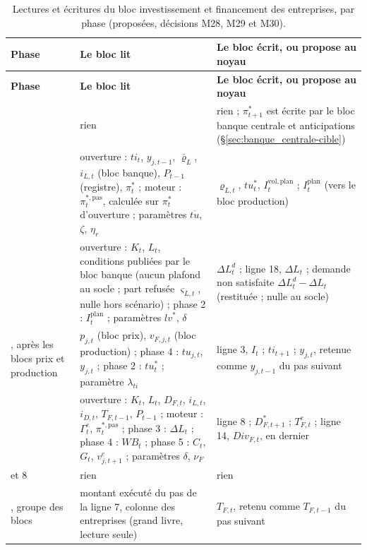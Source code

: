 \documentclass[11pt,a4paper]{article}
\begin{document}
\begin{center}\small
\begin{longtable}{>{\raggedright\arraybackslash}p{1.8cm}>{\raggedright\arraybackslash}p{7.3cm}>{\raggedright\arraybackslash}p{5.8cm}}
\caption{Lectures et écritures du bloc investissement et financement des entreprises, par phase (proposées, décisions M28, M29 et M30).}\label{tab:investissement-phases}\\
\toprule
\textbf{Phase} & \textbf{Le bloc lit} & \textbf{Le bloc écrit, ou propose au noyau}\\
\midrule
\endfirsthead
\toprule
\textbf{Phase} & \textbf{Le bloc lit} & \textbf{Le bloc écrit, ou propose au noyau}\\
\midrule
\endhead
1 & rien & rien ; $\pi^\ast_{t+1}$ est écrite par le bloc banque centrale et anticipations (\S\ref{sec:banque_centrale-cible})\\
2 & ouverture : $\mathit{ti}_t$, $y_{j,t-1}$, $\bar\varrho_L$, $i_{L,t}$ (bloc banque), $P_{t-1}$ (registre), $\pi^\ast_t$ ; moteur : $\pi^{\ast,\mathrm{pas}}_t$, calculée sur $\pi^\ast_t$ d'ouverture ; paramètres $\overline{\mathit{tu}}$, $\zeta$, $\eta_r$ & $\varrho_{L,t}$, $\mathit{tu}^\ast_t$, $I^{\mathrm{vol},\mathrm{plan}}_t$ ; $I^{\mathrm{plan}}_t$ (vers le bloc production)\\
3 & ouverture : $K_t$, $L_t$, conditions publiées par le bloc banque (aucun plafond au socle ; part refusée $\varsigma_{L,t}$, nulle hors scénario) ; phase 2 : $I^{\mathrm{plan}}_t$ ; paramètres $\mathit{lv}^\ast$, $\delta$ & $\Delta L^d_t$ ; ligne 18, $\Delta L_t$ ; demande non satisfaite $\Delta L^d_t - \Delta L_t$ (restituée ; nulle au socle)\\
5, après les blocs prix et production & $p_{j,t}$ (bloc prix), $v_{F,j,t}$ (bloc production) ; phase 4 : $\mathit{tu}_{j,t}$, $y_{j,t}$ ; phase 2 : $\mathit{tu}^\ast_t$ ; paramètre $\lambda_{\mathit{ti}}$ & ligne 3, $I_t$ ; $\mathit{ti}_{t+1}$ ; $y_{j,t}$, retenue comme $y_{j,t-1}$ du pas suivant\\
6 & ouverture : $K_t$, $L_t$, $D_{F,t}$, $i_{L,t}$, $i_{D,t}$, $T_{F,t-1}$, $P_{t-1}$ ; moteur : $\Gamma^e_t$, $\pi^{\ast,\mathrm{pas}}_t$ ; phase 3 : $\Delta L_t$ ; phase 4 : $\mathit{WB}_t$ ; phase 5 : $C_t$, $G_t$, $v^e_{j,t+1}$ ; paramètres $\delta$, $\nu_F$ & ligne 8 ; $D^\ast_{F,t+1}$ ; $T^e_{F,t}$ ; ligne 14, $\mathit{Div}_{F,t}$, en dernier\\
7 et 8 & rien & rien\\
9, groupe des blocs & montant exécuté du pas de la ligne 7, colonne des entreprises (grand livre, lecture seule) & $T_{F,t}$, retenu comme $T_{F,t-1}$ du pas suivant\\
\bottomrule
\end{longtable}
\end{center}
\end{document}
